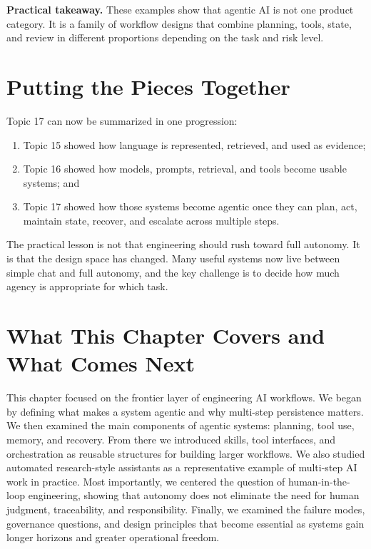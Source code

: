 \documentclass[12pt]{article}
\begin{document}
\begin{alert-box}
\textbf{Practical takeaway.} These examples show that agentic AI is not one product category. It is a family of workflow designs that combine planning, tools, state, and review in different proportions depending on the task and risk level.
\end{alert-box}

\section{Putting the Pieces Together}

Topic 17 can now be summarized in one progression:
\begin{enumerate}
    \item Topic 15 showed how language is represented, retrieved, and used as evidence;
    \item Topic 16 showed how models, prompts, retrieval, and tools become usable systems; and
    \item Topic 17 showed how those systems become agentic once they can plan, act, maintain state, recover, and escalate across multiple steps.
\end{enumerate}

The practical lesson is not that engineering should rush toward full autonomy. It is that the design space has changed. Many useful systems now live between simple chat and full autonomy, and the key challenge is to decide how much agency is appropriate for which task.

\section{What This Chapter Covers and What Comes Next}

This chapter focused on the frontier layer of engineering AI workflows. We began by defining what makes a system agentic and why multi-step persistence matters. We then examined the main components of agentic systems: planning, tool use, memory, and recovery. From there we introduced skills, tool interfaces, and orchestration as reusable structures for building larger workflows. We also studied automated research-style assistants as a representative example of multi-step AI work in practice. Most importantly, we centered the question of human-in-the-loop engineering, showing that autonomy does not eliminate the need for human judgment, traceability, and responsibility. Finally, we examined the failure modes, governance questions, and design principles that become essential as systems gain longer horizons and greater operational freedom.
\end{document}
